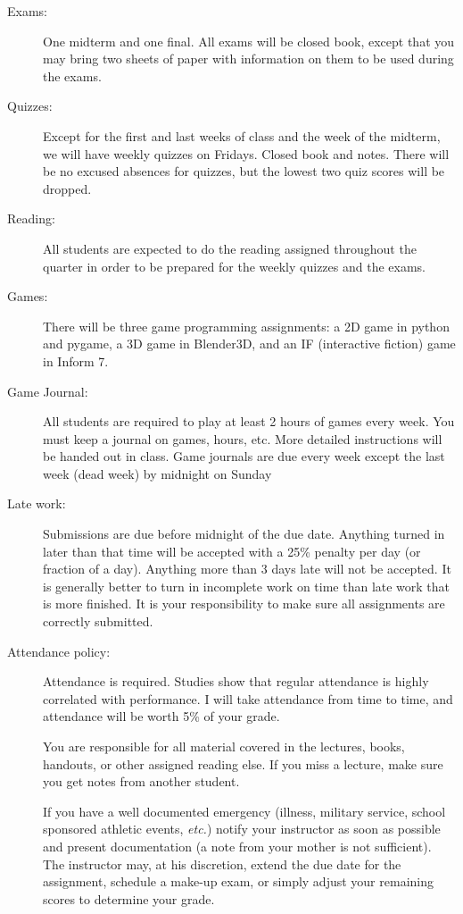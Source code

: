 \documentclass{article}
\begin{document}
\begin{description}
\item [Exams:] One midterm and one final.  All exams will be
  closed book, except that you may bring two sheets of paper with
  information on them to be used during the exams.

\item [Quizzes:] Except for the first and last weeks of class and the
  week of the midterm, we will have weekly quizzes on Fridays.  Closed
  book and notes.  There will be no excused absences for quizzes, but
  the lowest two quiz scores will be dropped.

\item [Reading:] All students are expected to do the 
  reading assigned throughout the quarter in order to be prepared for
  the weekly quizzes and the exams.

\item [Games:] There will be three game programming
  assignments:  a 2D game in python and pygame, a 3D game in Blender3D,
  and an IF (interactive fiction) game in Inform 7.

\item [Game Journal:] All students are required to play at least 2
  hours of games every week.  You must keep a journal on games, hours,
  etc.  More detailed instructions will be handed out in class. Game
  journals are due every week except the last week (dead week) by
  midnight on Sunday

\item[Late work:] Submissions are due before midnight of the due
date. Anything turned in later than that time will be accepted with a
25\% penalty per day (or fraction of a day).  Anything more than 3
days late will not be accepted.  It is generally better to turn in
incomplete work on time than late work that is more finished.
It is your responsibility to
make sure all assignments are correctly submitted.

\item[Attendance policy:] Attendance is required.  Studies show that
  regular attendance is highly correlated with performance.  I will
  take attendance from time to time, and attendance will be worth
  5\% of your grade.

  You are responsible for all material covered in the lectures, books,
  handouts, or other assigned reading else.  If you miss a lecture,
  make sure you get notes from another student.

  If you have a well documented emergency (illness, military service,
  school sponsored athletic events, {\em etc.}) notify your instructor
  as soon as possible and present documentation (a note from your
  mother is not sufficient).  The instructor may, at his discretion,
  extend the due date for the assignment, schedule a make-up exam,
  or simply adjust your remaining scores to determine your grade.


\end{description}
\end{document}
